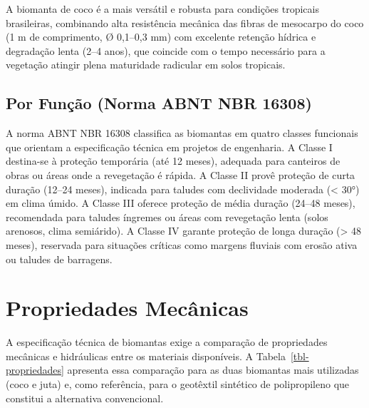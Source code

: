 \documentclass[
  portuguese,
  11pt,
  a4paper,
  open=any]{scrbook}
\begin{document}
A biomanta de coco é a mais versátil e robusta para condições tropicais
brasileiras, combinando alta resistência mecânica das fibras de
mesocarpo do coco (1 m de comprimento, Ø 0,1--0,3 mm) com excelente
retenção hídrica e degradação lenta (2--4 anos), que coincide com o
tempo necessário para a vegetação atingir plena maturidade radicular em
solos tropicais.

\subsection{Por Função (Norma ABNT NBR
16308)}\label{por-funuxe7uxe3o-norma-abnt-nbr-16308}

A norma ABNT NBR 16308 classifica as biomantas em quatro classes
funcionais que orientam a especificação técnica em projetos de
engenharia. A Classe I destina-se à proteção temporária (até 12 meses),
adequada para canteiros de obras ou áreas onde a revegetação é rápida. A
Classe II provê proteção de curta duração (12--24 meses), indicada para
taludes com declividade moderada (\textless{} 30°) em clima úmido. A
Classe III oferece proteção de média duração (24--48 meses), recomendada
para taludes íngremes ou áreas com revegetação lenta (solos arenosos,
clima semiárido). A Classe IV garante proteção de longa duração
(\textgreater{} 48 meses), reservada para situações críticas como
margens fluviais com erosão ativa ou taludes de barragens.

\section{Propriedades Mecânicas}\label{propriedades-mecuxe2nicas}

A especificação técnica de biomantas exige a comparação de propriedades
mecânicas e hidráulicas entre os materiais disponíveis. A
Tabela~\ref{tbl-propriedades} apresenta essa comparação para as duas
biomantas mais utilizadas (coco e juta) e, como referência, para o
geotêxtil sintético de polipropileno que constitui a alternativa
convencional.
\end{document}
